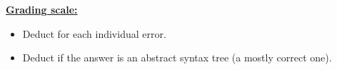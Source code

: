 \documentclass[11pt,fleqn]{article}
\begin{document}
\begin{enumerate}
\begin{multicols}{2}

          \end{multicols}

          \begin{info}{\textbf{\underline{Grading scale:}}}

            \begin{itemize}

              \addtolength{\itemsep}{3mm}

              \item Deduct  for each individual error.

              \item Deduct  if the answer is an abstract syntax tree
                    (a mostly correct one).

            \end{itemize}

          \end{info}

  \end{enumerate}
\end{document}
